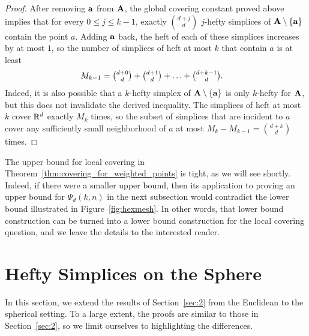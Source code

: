 \documentclass[10pt,a4paper]{article}
\newcommand {\mm}[1] {\ifmmode{#1}\else{\mbox{\(#1\)}}\fi}
\theoremstyle{plain}
\newcommand{\Rspace}        {\mm{{\mathbb R}}}
\newcommand{\AAA}           {\mm{\bf A}}
\newcommand{\aaa}           {\mm{\bf a}}
\begin{document}
\begin{proof}
  After removing $\aaa$ from $\AAA$, the global covering constant proved above implies that for every $0 \leq j \leq k-1$, exactly $\binom{d+j}{d}$ $j$-hefty simplices of $\AAA \setminus \{ \aaa \}$ contain the point $a$.
  Adding $\aaa$ back, the heft of each of these simplices increases by at most $1$, so the number of simplices of heft at most $k$ that contain $a$ is at least
  \begin{align}
    M_{k-1} &= \tbinom{d+0}{d} + \tbinom{d+1}{d} + \ldots + \tbinom{d+k-1}{d} .
  \end{align}
  Indeed, it is also possible that a $k$-hefty simplex of $\AAA \setminus \{ \aaa \}$ is only $k$-hefty for $\AAA$, but this does not invalidate the derived inequality.
  The simplices of heft at most $k$ cover $\Rspace^d$ exactly $M_k$ times, so the subset of simplices that are incident to $a$ cover any sufficiently small neighborhood of $a$ at most $M_k - M_{k-1} = \binom{d+k}{d}$ times.
\end{proof}
The upper bound for local covering in Theorem~\ref{thm:covering_for_weighted_points} is tight, as we will see shortly.
Indeed, if there were a smaller upper bound, then its application to proving an upper bound for $\Psi_d (k,n)$ in the next subsection would contradict the lower bound illustrated in Figure~\ref{fig:hexmesh}.
In other words, that lower bound construction can be turned into a lower bound construction for the local covering question, and we leave the details to the interested reader.
\section{Hefty Simplices on the Sphere}
\label{sec:3}
In this section, we extend the results of Section~\ref{sec:2} from the Euclidean to the spherical setting.
To a large extent, the proofs are similar to those in Section~\ref{sec:2}, so we limit ourselves to highlighting the differences.
\end{document}
